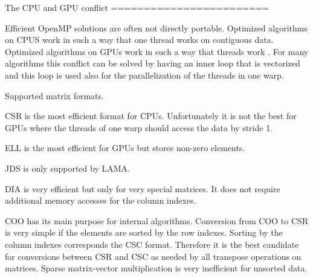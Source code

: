 
The CPU and GPU conflict
========================

Efficient OpenMP solutions are often not directly portable. Optimized algorithms on CPUS work in such a way that one
thread works on contiguous data. Optimized algorithms on GPUs work in such a way that threads work .
For many algorithms this conflict can be solved by having an inner loop that is vectorized and this loop is used 
also for the parallelization of the threads in one warp.

Supported matrix formats.

CSR is the most efficient format for CPUs. Unfortunately it is not the best for GPUs where the threads of one warp should access the data by stride 1.

ELL is the most efficient for GPUs but stores non-zero elements.

JDS is only supported by LAMA. 

DIA is very efficient but only for very special matrices. It does not require additional memory accesses for the column indexes.

COO has its main purpose for internal algorithms. Conversion from COO to CSR is very simple if the elements are sorted by the row
indexes. Sorting by the column indexes corresponds the CSC format. Therefore it is the best candidate for conversions between
CSR and CSC as needed by all transpose operations on matrices. Sparse matrix-vector multiplication is very inefficient for unsorted data.

